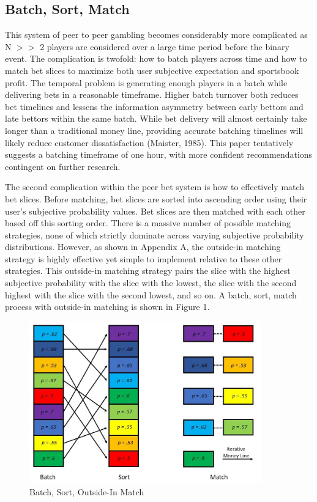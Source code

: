 \documentclass[sn-mathphys-num]{sn-jnl}
\theoremstyle{thmstyleone}%
\theoremstyle{thmstyletwo}%
\theoremstyle{thmstylethree}%
\begin{document}
\subsection{Batch, Sort, Match}

This system of peer to peer gambling becomes considerably more complicated as\\N $>>$ 2 players are considered over a large time period before the binary event. The complication is twofold: how to batch players across time and how to match bet slices to maximize both user subjective expectation and sportsbook profit. The temporal problem is generating enough players in a batch while delivering bets in a reasonable timeframe. Higher batch turnover both reduces bet timelines and lessens the information asymmetry between early bettors and late bettors within the same batch. While bet delivery will almost certainly take longer than a traditional money line, providing accurate batching timelines will likely reduce customer dissatisfaction (Maister, 1985). This paper tentatively suggests a batching timeframe of one hour, with more confident recommendations contingent on further research.

The second complication within the peer bet system is how to effectively match bet slices. Before matching, bet slices are sorted into ascending order using their user's subjective probability values. Bet slices are then matched with each other based off this sorting order. There is a massive number of possible matching strategies, none of which strictly dominate across varying subjective probability distributions. However, as shown in Appendix A, the outside-in matching strategy is highly effective yet simple to implement relative to these other strategies. This outside-in matching strategy pairs the slice with the highest subjective probability with the slice with the lowest, the slice with the second highest with the slice with the second lowest, and so on. A batch, sort, match process with outside-in matching is shown in Figure 1. 

\begin{figure}[H]
	\centering
	\includegraphics[width=10cm]{Batch Sort Match - IO}
	\caption{Batch, Sort, Outside-In Match}
\end{figure}
\end{document}
